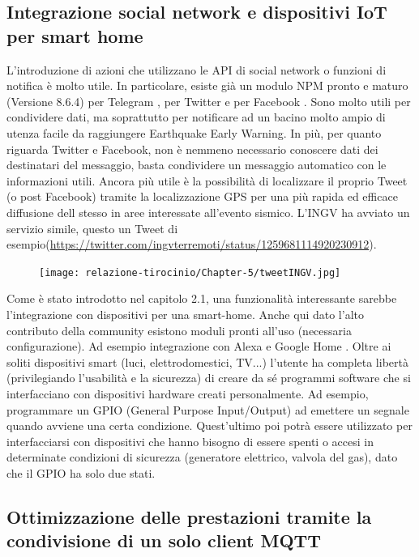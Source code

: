 \documentclass[a4paper,10pt]{memoir}
\begin{document}
\subsection{Integrazione social network e dispositivi IoT per smart home}

L'introduzione di azioni che utilizzano le API di social network o funzioni di notifica è molto utile. In particolare, esiste già un modulo NPM pronto e maturo (Versione 8.6.4) per Telegram \cite{telegram-node}, per Twitter \cite{twitter-node} e per Facebook \cite{facebook-node}.
Sono molto utili per condividere dati, ma soprattutto per notificare ad un bacino molto ampio di utenza facile da raggiungere Earthquake Early Warning. In più, per quanto riguarda Twitter e Facebook, non è nemmeno necessario conoscere dati dei destinatari del messaggio, basta condividere un messaggio automatico con le informazioni utili. Ancora più utile è la possibilità di localizzare il proprio Tweet (o post Facebook) tramite la localizzazione GPS per una più rapida ed efficace diffusione dell stesso in aree interessate all'evento sismico.
L'INGV ha avviato un servizio simile, questo un Tweet di esempio(\href{https://twitter.com/ingvterremoti/status/1259681114920230912}{https://twitter.com/ingvterremoti/status/1259681114920230912}).
\begin{figure}[ht]
    \centering
    \texttt{[image: relazione-tirocinio/Chapter-5/tweetINGV.jpg]}
    \label{fig:tweetINGV}
\end{figure}

Come è stato introdotto nel capitolo 2.1, una funzionalità interessante sarebbe l'integrazione con dispositivi per una smart-home. Anche qui dato l'alto contributo della community esistono moduli pronti all'uso (necessaria configurazione). Ad esempio integrazione con Alexa \cite{alexa} e Google Home \cite{google-home}.
Oltre ai soliti dispositivi smart (luci, elettrodomestici, TV...) l'utente ha completa libertà (privilegiando l'usabilità e la sicurezza) di creare da sé programmi software che si interfacciano con dispositivi hardware creati personalmente. Ad esempio, programmare un GPIO (General Purpose Input/Output) ad emettere un segnale quando avviene una certa condizione. Quest'ultimo poi potrà essere utilizzato per interfacciarsi con dispositivi che hanno bisogno di essere spenti o accesi in determinate condizioni di sicurezza (generatore elettrico, valvola del gas), dato che il GPIO ha solo due stati.

\subsection{Ottimizzazione delle prestazioni tramite la condivisione di un solo client MQTT}
\end{document}
